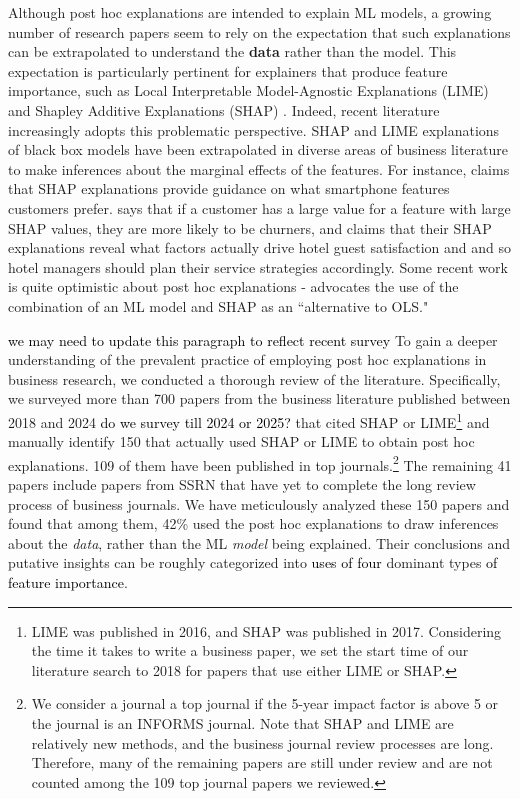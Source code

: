 \documentclass[mnsc,blindrev]{informs3}
\begin{document}
Although post hoc explanations are intended to explain ML models, a growing number of research papers seem to rely on the expectation that such explanations can be extrapolated to understand the \textbf{data} rather than the model. This expectation is particularly pertinent for explainers that produce feature importance, such as Local Interpretable Model-Agnostic Explanations (LIME) \citep{ribeiro16lime} and Shapley Additive Explanations (SHAP) \citep{lundberg17shap}.
Indeed, recent literature increasingly adopts this problematic perspective. SHAP and LIME explanations of black box models have been extrapolated in diverse areas of business literature to make inferences about the marginal effects of the features. For instance, \cite{park2024extracting} claims that SHAP explanations provide guidance on what smartphone features customers prefer. \cite{jiang24churn} says that if a customer has a large value for a feature with large SHAP values, they are more likely to be churners, and \cite{sanchez2023role} claims that their SHAP explanations reveal what factors actually drive hotel guest satisfaction and and so hotel managers should plan their service strategies accordingly. Some recent work is quite optimistic about post hoc explanations - \cite{berger2023supply} advocates the use of the combination of an ML model and SHAP as an ``alternative to OLS."

\textcolor{black}{we may need to update this paragraph to reflect recent survey}
To gain a deeper understanding of the prevalent practice of employing post hoc explanations in business research, we conducted a thorough review of the literature. Specifically, we surveyed more than 700 papers from the business literature published between 2018 and 2024 \textcolor{black}{do we survey till 2024 or 2025?}  that cited SHAP or LIME\footnote{LIME was published in 2016, and SHAP was published in 2017. Considering the time it takes to write a business paper, we set the start time of our literature search to 2018 for papers that use either LIME or SHAP.}  and manually identify 150 that actually used SHAP or LIME to obtain post hoc explanations. 109 of them have been published in top journals.\footnote{We consider a journal a top journal if the 5-year impact factor is above 5 or the journal is an INFORMS journal. Note that SHAP and LIME are relatively new methods, and the business journal review processes are long. Therefore, many of the remaining papers are still under review and are not counted among the 109 top journal papers we reviewed.} The remaining 41 papers include papers from SSRN that have yet to complete the long review process of business journals. We have meticulously analyzed these 150 papers and found that among them, 42\% used the post hoc explanations to draw inferences about the \textit{data}, rather than the ML \textit{model} being explained. Their conclusions and putative insights can be roughly categorized into \textcolor{black}{uses of four} dominant types \textcolor{black}{of feature importance}. 
\end{document}

